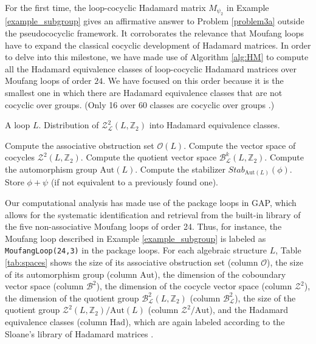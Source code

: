 \documentclass[11pt,a4paper]{article}
\begin{document}
For the first time, the loop-cocyclic Hadamard matrix $M_{\psi_2}$ in Example \ref{example_subgroup} gives an affirmative answer to Problem \ref{problem3a} outside the pseudococyclic framework. It corroborates the relevance that Moufang loops have to expand the classical cocyclic development of Hadamard matrices. In order to delve into this milestone, we have made use of Algorithm \ref{alg:HM} to compute all the Hadamard equivalence classes of loop-cocyclic Hadamard matrices over Moufang loops of order $24$. We have focused on this order because it is the smallest one in which there are Hadamard equivalence classes that are not cocyclic over groups. (Only 16 over 60 classes are cocyclic over groups \citealp{OC11}.)

\begin{algorithm}[H]
\caption{Enumeration of loop-cocyclic Hadamard matrices}\label{alg:HM}
\begin{algorithmic}[1]
\Require A loop $L$.
\Ensure Distribution of $\mathcal{Z}_\mathcal{L}^2(L,\mathbb{Z}_2)$ into Hadamard equivalence classes.

\State Compute the associative obstruction set $\mathcal{O}(L)$.
\State Compute the vector space of cocycles $\mathcal{Z}^2(L, \mathbb{Z}_2)$.
\State Compute the quotient vector space $\mathcal{B}_\mathcal{L}^k(L,\mathbb{Z}_2)$.
\State Compute the automorphism group $\mathrm{Aut}(L)$.
        \State Compute the stabilizer $Stab_{\mathrm{Aut}(L)}(\phi)$.
                \State Store $\phi + \psi$ (if not equivalent to a previously found one).
            \EndIf
        \EndFor
    \EndFor
\end{algorithmic}
\end{algorithm}

Our computational analysis has made use of the package {\sc loops} \citep{Vojtechovsky2024} in {\sc GAP}, which allows for the systematic identification and retrieval from the built-in library of the five non-associative Moufang loops of order 24. Thus, for instance, the Moufang loop described in Example \ref{example_subgroup} is labeled as \texttt{MoufangLoop(24,3)} in the package {\sc loops}. For each algebraic structure $L$, Table \ref{tab:spaces} shows the size of its associative obstruction set (column $\mathcal{O}$), the size of its automorphism group (column $\mathrm{Aut}$), the dimension of the coboundary vector space (column $\mathcal{B}^2$), the dimension of the cocycle vector space (column $\mathcal{Z}^2$), the dimension of the quotient group $\mathcal{B}^2_\mathcal{L}(L,\mathbb{Z}_2)$ (column $\mathcal{B}^2_\mathcal{L}$), the size of the quotient group $\mathcal{Z}^2(L,\mathbb{Z}_2)/\mathrm{Aut}(L)$ (column $\mathcal{Z}^2/\mathrm{Aut}$), and the Hadamard equivalence classes (column $\mathrm{Had}$), which are again labeled according to the Sloane's library of Hadamard matrices \citep{Sloane}.
\end{document}
